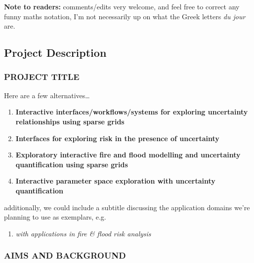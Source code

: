 \documentclass[a4paper,fontsize=12pt]{scrartcl}
\author{}
\date{\today}
\begin{document}
\noindent
\textbf{Note to readers:} comments/edits very welcome, and feel free to correct any funny maths notation, I'm not
  necessarily up on what the Greek letters \emph{du jour} are.

\renewcommand{\thesection}{\Alph{section}}

\setcounter{section}{3} %
\subsection{Project Description}
\label{sec:project-description}

\subsubsection*{PROJECT TITLE}

\noindent Here are a few alternatives\ldots

\begin{enumerate}
  \item \textbf{Interactive interfaces/workflows/systems for exploring uncertainty relationships using sparse grids}
\item \textbf{Interfaces for exploring risk in the presence of uncertainty}
\item \textbf{Exploratory interactive fire and flood modelling and
  uncertainty quantification using sparse grids}
\item \textbf{Interactive parameter space exploration with uncertainty
  quantification}
\end{enumerate}

\noindent additionally, we could include a subtitle discussing the
application domains we're planning to use as exemplars, e.g.

\begin{enumerate}
\item \emph{with applications in fire \& flood risk analysis}
\end{enumerate}

\subsubsection*{AIMS AND BACKGROUND}
\end{document}
